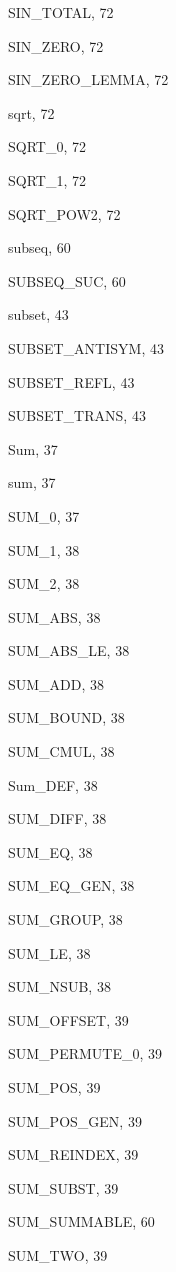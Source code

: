 \begin{theindex}
  \item {\ptt SIN\_TOTAL}, 72
  \item {\ptt SIN\_ZERO}, 72
  \item {\ptt SIN\_ZERO\_LEMMA}, 72
  \item {\ptt sqrt}, 72
  \item {\ptt SQRT\_0}, 72
  \item {\ptt SQRT\_1}, 72
  \item {\ptt SQRT\_POW2}, 72
  \item {\ptt subseq}, 60
  \item {\ptt SUBSEQ\_SUC}, 60
  \item {\ptt subset}, 43
  \item {\ptt SUBSET\_ANTISYM}, 43
  \item {\ptt SUBSET\_REFL}, 43
  \item {\ptt SUBSET\_TRANS}, 43
  \item {\ptt Sum}, 37
  \item {\ptt sum}, 37
  \item {\ptt SUM\_0}, 37
  \item {\ptt SUM\_1}, 38
  \item {\ptt SUM\_2}, 38
  \item {\ptt SUM\_ABS}, 38
  \item {\ptt SUM\_ABS\_LE}, 38
  \item {\ptt SUM\_ADD}, 38
  \item {\ptt SUM\_BOUND}, 38
  \item {\ptt SUM\_CMUL}, 38
  \item {\ptt Sum\_DEF}, 38
  \item {\ptt SUM\_DIFF}, 38
  \item {\ptt SUM\_EQ}, 38
  \item {\ptt SUM\_EQ\_GEN}, 38
  \item {\ptt SUM\_GROUP}, 38
  \item {\ptt SUM\_LE}, 38
  \item {\ptt SUM\_NSUB}, 38
  \item {\ptt SUM\_OFFSET}, 39
  \item {\ptt SUM\_PERMUTE\_0}, 39
  \item {\ptt SUM\_POS}, 39
  \item {\ptt SUM\_POS\_GEN}, 39
  \item {\ptt SUM\_REINDEX}, 39
  \item {\ptt SUM\_SUBST}, 39
  \item {\ptt SUM\_SUMMABLE}, 60
  \item {\ptt SUM\_TWO}, 39

\end{theindex}
